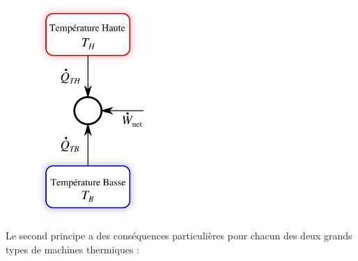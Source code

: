 		\begin{figure}%
			\begin{center}
				\includegraphics[height=8cm]{images/moteur_forme_generale.png}
			\end{center}
			\label{fig_conventions_notation_machines_thermiques}
		\end{figure}

		\clearfloats
		Le second principe a des conséquences particulières pour chacun des deux grands types de machines thermiques :

